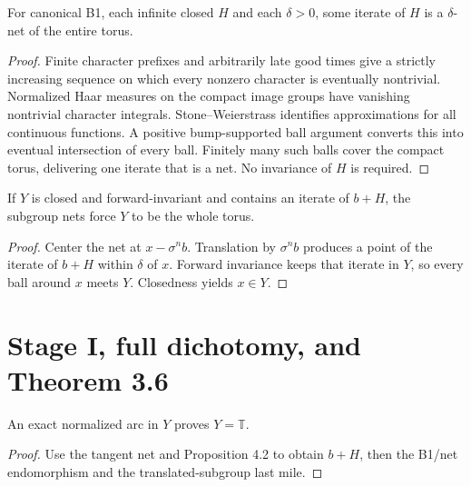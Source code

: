 \begin{theorem}
  \label{thm:unit-prime-net}
  \leanok
  For canonical B1, each infinite closed \(H\) and each \(\delta>0\), some
  iterate of \(H\) is a \(\delta\)-net of the entire torus.
\end{theorem}
\begin{proof}
  Finite character prefixes and arbitrarily late good times give a strictly
  increasing sequence on which every nonzero character is eventually nontrivial.
  Normalized Haar measures on the compact image groups have vanishing nontrivial
  character integrals. Stone--Weierstrass identifies approximations for all
  continuous functions. A positive bump-supported ball argument converts this
  into eventual intersection of every ball. Finitely many such balls cover the
  compact torus, delivering one iterate that is a net. No invariance of \(H\)
  is required.
\end{proof}

\begin{lemma}
  \label{lem:translate-last-mile}
  \leanok
  If \(Y\) is closed and forward-invariant and contains an iterate of \(b+H\),
  the subgroup nets force \(Y\) to be the whole torus.
\end{lemma}
\begin{proof}
  Center the net at \(x-\sigma^n b\). Translation by \(\sigma^n b\) produces a
  point of the iterate of \(b+H\) within \(\delta\) of \(x\). Forward invariance
  keeps that iterate in \(Y\), so every ball around \(x\) meets \(Y\). Closedness
  yields \(x\in Y\).
\end{proof}

\section{Stage I, full dichotomy, and Theorem 3.6}

\begin{theorem}
  \label{thm:stage-one-arc}
  \leanok
  An exact normalized arc in \(Y\) proves \(Y=\mathbb T\).
\end{theorem}
\begin{proof}
  Use the tangent net and Proposition 4.2 to obtain \(b+H\), then the B1/net
  endomorphism and the translated-subgroup last mile.
\end{proof}

